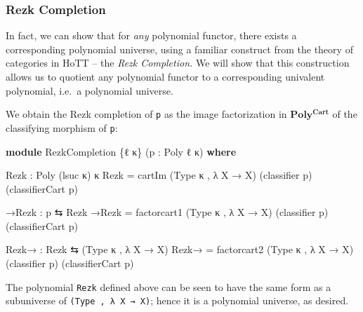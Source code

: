 \documentclass[
  11pt,
  oneside,
  article]{memoir}
\newenvironment{Shaded}{}{}
\newcommand{\KeywordTok}[1]{\textcolor[rgb]{0.00,0.44,0.13}{\textbf{#1}}}
\newcommand{\NormalTok}[1]{#1}
\newcommand{\OtherTok}[1]{\textcolor[rgb]{0.00,0.44,0.13}{#1}}
\theoremstyle{definition}
\theoremstyle{plain}
\newcommand{\0}{\textsf{0}}
\newcommand{\1}{\tn{\textsf{1}}}
\begin{document}
\subsubsection{Rezk Completion}\label{rezk-completion}

In fact, we can show that for \emph{any} polynomial functor, there
exists a corresponding polynomial universe, using a familiar construct
from the theory of categories in HoTT -- the \emph{Rezk Completion.}
\cite{ahrens2015univalent} We will show that this construction allows us
to quotient any polynomial functor to a corresponding univalent
polynomial, i.e.~a polynomial universe.

We obtain the Rezk completion of \texttt{p} as the image factorization
in \(\mathbf{Poly^{Cart}}\) of the classifying morphism of \texttt{p}:

\begin{Shaded}
\begin{Highlighting}[]
\KeywordTok{module}\NormalTok{ RezkCompletion }\OtherTok{\{}\NormalTok{ℓ κ}\OtherTok{\}} \OtherTok{(}\NormalTok{p }\OtherTok{:}\NormalTok{ Poly ℓ κ}\OtherTok{)} \KeywordTok{where}

\NormalTok{    Rezk }\OtherTok{:}\NormalTok{ Poly }\OtherTok{(}\NormalTok{lsuc κ}\OtherTok{)}\NormalTok{ κ}
\NormalTok{    Rezk }\OtherTok{=}\NormalTok{ cartIm }\OtherTok{(}\NormalTok{Type κ , }\OtherTok{λ}\NormalTok{ X }\OtherTok{→}\NormalTok{ X}\OtherTok{)} 
            \OtherTok{(}\NormalTok{classifier p}\OtherTok{)} \OtherTok{(}\NormalTok{classifierCart p}\OtherTok{)}

\NormalTok{    →Rezk }\OtherTok{:}\NormalTok{ p ⇆ Rezk}
\NormalTok{    →Rezk }\OtherTok{=}\NormalTok{ factorcart1 }\OtherTok{(}\NormalTok{Type κ , }\OtherTok{λ}\NormalTok{ X }\OtherTok{→}\NormalTok{ X}\OtherTok{)} 
                \OtherTok{(}\NormalTok{classifier p}\OtherTok{)} \OtherTok{(}\NormalTok{classifierCart p}\OtherTok{)}

\NormalTok{    Rezk→ }\OtherTok{:}\NormalTok{ Rezk ⇆ }\OtherTok{(}\NormalTok{Type κ , }\OtherTok{λ}\NormalTok{ X }\OtherTok{→}\NormalTok{ X}\OtherTok{)}
\NormalTok{    Rezk→ }\OtherTok{=}\NormalTok{ factorcart2 }\OtherTok{(}\NormalTok{Type κ , }\OtherTok{λ}\NormalTok{ X }\OtherTok{→}\NormalTok{ X}\OtherTok{)} 
                \OtherTok{(}\NormalTok{classifier p}\OtherTok{)} \OtherTok{(}\NormalTok{classifierCart p}\OtherTok{)}
\end{Highlighting}
\end{Shaded}

The polynomial \texttt{Rezk} defined above can be seen to have the same
form as a subuniverse of \texttt{(Type\ ,\ λ\ X\ →\ X)}; hence it is a
polynomial universe, as desired.
\end{document}
